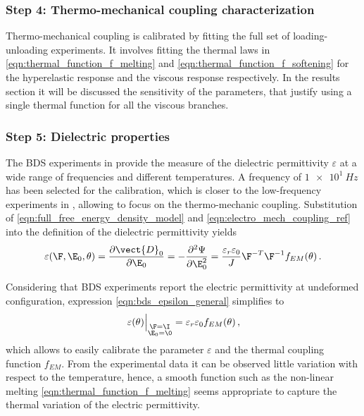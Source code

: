 \subsubsection{Step 4: Thermo-mechanical coupling characterization}

Thermo-mechanical coupling is calibrated by fitting the full set of loading-unloading experiments. It involves fitting the thermal laws in \eqref{eqn:thermal_function_f_melting} and \eqref{eqn:thermal_function_f_softening} for the hyperelastic response and the viscous response respectively. In the results section it will be discussed the sensitivity of the parameters, that justify using a single thermal function for all the viscous branches.


\subsubsection{Step 5: Dielectric properties}

The BDS experiments in \cite{Sheng2012} provide the measure of the dielectric permittivity $\varepsilon$ at a wide range of frequencies and different temperatures. A frequency of $\SI{1e1}{Hz}$ has been selected for the calibration, which is closer to the low-frequency experiments in \cite{Mehnert2021a}, allowing to focus on the thermo-mechanic coupling. Substitution of \eqref{eqn:full_free_energy_density_model} and \eqref{eqn:electro_mech_coupling_ref} into the definition of the dielectric permittivity yields
\begin{equation} \label{eqn:bds_epsilon_general}
  \varepsilon(\F,\E_0,\theta) =
    \frac{\partial \vect{D}_0}{\partial \E_0} =
    -\frac{\partial^2 \Psi}{\partial \E_0^2} =
    \frac{\varepsilon_r\varepsilon_0}{J}\F^{-T}\F^{-1} f_{EM}(\theta) \,.
\end{equation}

Considering that BDS experiments report the electric permittivity at undeformed configuration, expression \eqref{eqn:bds_epsilon_general} simplifies to
\begin{equation}
  \left.\varepsilon(\theta)\vphantom{a_{\substack{a\\a}}}\right|_{\substack{\F=\I\\ \E_0=\0}} =
    \varepsilon_r\varepsilon_0 f_{EM}(\theta) \,,
\end{equation}
which allows to easily calibrate the parameter $\varepsilon$ and the thermal coupling function $f_{EM}$. From the experimental data it can be observed little variation with respect to the temperature, hence, a smooth function such as the non-linear melting \eqref{eqn:thermal_function_f_melting} seems appropriate to capture the thermal variation of the electric permittivity.


